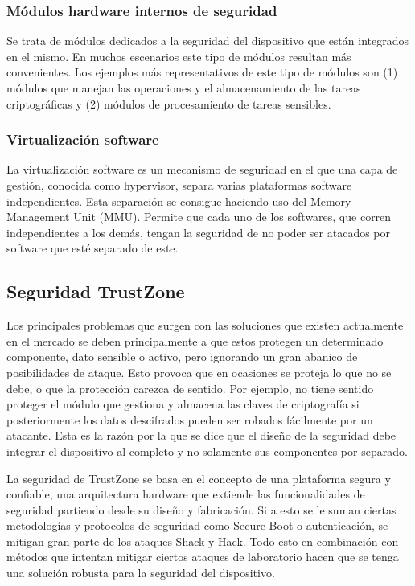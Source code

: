 \subsubsection{Módulos hardware internos de seguridad}
Se trata de módulos dedicados a la seguridad del dispositivo que están integrados en el mismo. En muchos escenarios este tipo de módulos resultan más convenientes. Los ejemplos más representativos de este tipo de módulos son (1) módulos que manejan las operaciones y el almacenamiento de las tareas criptográficas y (2) módulos de procesamiento de tareas sensibles.

\subsubsection{Virtualización software}
La virtualización software es un mecanismo de seguridad en el que una capa de gestión, conocida como hypervisor, separa varias plataformas software independientes. Esta separación se consigue haciendo uso del Memory Management Unit (MMU). Permite que cada uno de los softwares, que corren independientes a los demás, tengan la seguridad de no poder ser atacados por software que esté separado de este.


\subsection{Seguridad TrustZone}

Los principales problemas que surgen con las soluciones que existen actualmente en el mercado se deben principalmente a que estos protegen un determinado componente, dato sensible o activo, pero ignorando un gran abanico de posibilidades de ataque. Esto provoca que en ocasiones se proteja lo que no se debe, o que la protección carezca de sentido. Por ejemplo, no tiene sentido proteger el módulo que gestiona y almacena las claves de criptografía si posteriormente los datos descifrados pueden ser robados fácilmente por un atacante. Esta es la razón por la que se dice que el diseño de la seguridad debe integrar el dispositivo al completo y no solamente sus componentes por separado. \newline

La seguridad de TrustZone se basa en el concepto de una plataforma segura y confiable, una arquitectura hardware que extiende las funcionalidades de seguridad partiendo desde su diseño y fabricación. Si a esto se le suman ciertas metodologías y protocolos de seguridad como Secure Boot o autenticación, se mitigan gran parte de los ataques Shack y Hack. Todo esto en combinación con métodos que intentan mitigar ciertos ataques de laboratorio hacen que se tenga una solución robusta para la seguridad del dispositivo.

